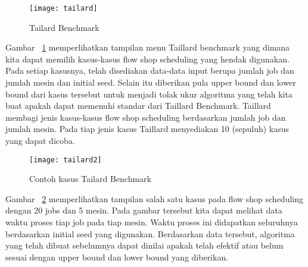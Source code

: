 \begin{figure}[H]
	\centering
	\texttt{[image: tailard]}
	\caption[Tailard Benchmark] {Tailard Benchmark}
	\label{fig:tailard1}
\end{figure}
Gambar ~\ref{fig:tailard1} memperlihatkan tampilan menu Taillard benchmark yang dimana kita dapat memilih
kasus-kasus flow shop scheduling yang hendak digunakan. Pada setiap kasusnya, telah disediakan
data-data input berupa jumlah job dan jumlah mesin dan initial seed. Selain itu diberikan
pula upper bound dan lower bound dari kasus tersebut untuk menjadi tolak ukur algoritma yang
telah kita buat apakah dapat memenuhi standar dari Taillard Benchmark.
Taillard membagi jenis kasus-kasus flow shop scheduling berdasarkan jumlah job dan jumlah
mesin. Pada tiap jenis kasus Taillard menyediakan 10 (sepuluh) kasus yang dapat dicoba.
\begin{figure}[H]
	\centering
	\texttt{[image: tailard2]}
	\caption[Contoh kasus Tailard Benchmark] {Contoh kasus Tailard Benchmark}
	\label{fig:tailard2}
\end{figure}
Gambar ~\ref{fig:tailard2} memperlihatkan tampilan salah satu kasus pada flow shop scheduling dengan 20
jobs dan 5 mesin. Pada gambar tersebut kita dapat melihat data waktu proses tiap job pada
tiap mesin. Waktu proses ini didapatkan seluruhnya berdasarkan initial seed yang digunakan.
Berdasarkan data tersebut, algoritma yang telah dibuat sebelumnya dapat dinilai apakah telah 
efektif atau belum sesuai dengan upper bound dan lower bound yang diberikan.











